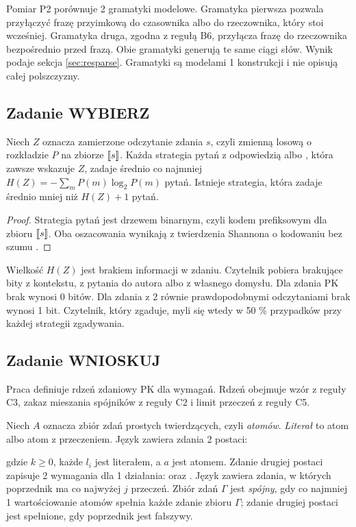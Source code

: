 Pomiar P2 porównuje 2 gramatyki modelowe. Gramatyka pierwsza pozwala przyłączyć frazę
przyimkową do czasownika albo do rzeczownika, który stoi wcześniej. Gramatyka druga,
zgodna z regułą B6, przyłącza frazę do rzeczownika bezpośrednio przed frazą. Obie gramatyki
generują te same ciągi słów. Wynik podaje sekcja \ref{sec:resparse}. Gramatyki są modelami
1 konstrukcji i nie opisują całej polszczyzny.

\subsection{Zadanie WYBIERZ}

\begin{theorem}
\label{thm:questions}
Niech $Z$ oznacza zamierzone odczytanie zdania $s$, czyli zmienną losową o rozkładzie $P$
na zbiorze $[\![s]\!]$. Każda strategia pytań z odpowiedzią  albo , która zawsze
wskazuje $Z$, zadaje średnio co najmniej $H(Z)=-\sum_m P(m)\log_2P(m)$ pytań. Istnieje
strategia, która zadaje średnio mniej niż $H(Z)+1$ pytań.
\end{theorem}

\begin{proof}
Strategia pytań jest drzewem binarnym, czyli kodem prefiksowym dla zbioru $[\![s]\!]$.
Oba oszacowania wynikają z twierdzenia Shannona o kodowaniu bez szumu \cite{shannon1948}.
\end{proof}

Wielkość $H(Z)$ jest brakiem informacji w zdaniu. Czytelnik pobiera brakujące bity
z kontekstu, z pytania do autora albo z własnego domysłu. Dla zdania PK brak wynosi 0 bitów.
Dla zdania z 2 równie prawdopodobnymi odczytaniami brak wynosi 1 bit. Czytelnik, który
zgaduje, myli się wtedy w 50 \% przypadków przy każdej strategii zgadywania.

\subsection{Zadanie WNIOSKUJ}
\label{sec:horn}

Praca definiuje rdzeń zdaniowy PK dla wymagań. Rdzeń obejmuje wzór 
z reguły C3, zakaz mieszania spójników z reguły C2 i limit przeczeń z reguły C5.

\begin{definition}
Niech $A$ oznacza zbiór zdań prostych twierdzących, czyli \emph{atomów}. \emph{Literał} to
atom albo atom z przeczeniem. Język \PKz{} zawiera zdania 2 postaci:
\begin{center}
\qquad
{}
\end{center}
gdzie $k\ge0$, każde $l_i$ jest literałem, a $a$ jest atomem. Zdanie drugiej postaci
zapisuje 2 wymagania dla 1 działania:  oraz . Język 
zawiera zdania, w których poprzednik ma co najwyżej $j$ przeczeń. Zbiór zdań $\Gamma$ jest
\emph{spójny}, gdy co najmniej 1 wartościowanie atomów spełnia każde zdanie zbioru $\Gamma$;
zdanie drugiej postaci jest spełnione, gdy poprzednik jest fałszywy.
\end{definition}

